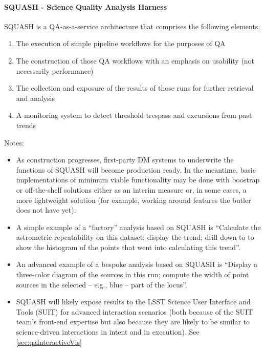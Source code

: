 \paragraph{SQUASH - Science Quality Analysis Harness}
\label{sec:qaSquash}

SQUASH is a QA-as-a-service architecture that comprises the following elements:

\begin{enumerate}

\item The execution of simple pipeline workflows for the purposes of QA

\item The construction of those QA workflows with an emphasis on usability (not necessarily performance)

\item The collection and exposure of the results of those runs for further retrieval and analysis

\item A monitoring system to detect threshold trespass and excursions from past trends

\end{enumerate}

Notes:

\begin{itemize}

\item As construction progresses, first-party DM systems to underwrite the functions of SQUASH will become production ready. In the meantime, basic implementations of minimum viable functionality may be done with boostrap or off-the-shelf solutions either as an interim measure or, in some cases, a more lightweight solution (for example, working around features the butler does not have yet).

\item A simple example of a ``factory'' analysis based on SQUASH is ``Calculate the astrometric repeatability on this dataset; display the trend; drill down to to show the histogram of the points that went into calculating this trend''.

\item An advanced example of a bespoke analysis based on SQUASH is ``Display a three-color diagram of the sources in this run; compute the width of point sources in the selected -- e.g., blue -- part of the locus''.

\item SQUASH will likely expose results to the LSST Science User Interface and Tools (SUIT) for advanced interaction scenarios (both because of the SUIT team's front-end expertise but also because they are likely to be similar to science-driven interactions in intent and in execution). See \ref{sec:qaInteractiveVis}

\end{itemize}

